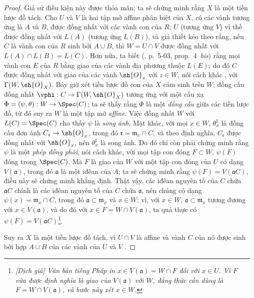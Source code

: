 \documentclass[oneside]{amsart}
\makeatletter
\newcommand{\ega@arrow}[2]{\mathchoice{#1}{#2}{#2}{#2}}
\renewcommand{\to}{\ega@arrow{\longrightarrow}{\rightarrow}}
\makeatother
\begin{document}
\begin{proof}
Giả sử điều kiện này được thỏa mãn; ta sẽ chứng minh rằng $X$ là một tiền lược đồ tách.
Cho $U$ và $V$ là hai tập mở affine phân biệt của $X$, có các vành tương ứng là $A$ và $B$, được đồng nhất với các vành con của $R$;
$U$ (tương ứng $V$) vì thế được đồng nhất  với $L(A)$ (tương ứng $L(B)$), và giả thiết kéo theo  rằng, nếu $C$ là vành con của $R$ sinh bởi $A\cup B$, thì $W=U\cap V$ được đồng nhất với $L(A)\cap L(B)=L(C)$.
Hơn nữa, ta biết (\cite{I-1}, p.~5-03, prop.~4~\emph{bis}) rằng mọi vành con $E$ của $R$ bằng giao của các vành địa phương thuộc $L(E)$;
do đó $C$ được đồng nhất với giao của các vành $\sh{O}_z$ với $z\in W$, nói cách khác , với $\Gamma(W,\sh{O}_X)$.
Bây giờ xét tiền lược đồ con của $X$ cảm sinh trên $W$;
đồng cấu đồng nhất $\vphi: C\to\Gamma(W,\sh{O}_X)$ tương ứng  với một cấu xạ $\Phi=(\psi,\theta):W\to\Spec(C)$;
ta sẽ thấy rằng $\Phi$ là một \emph{đẳng cấu} giữa các tiền lược đồ, từ đó suy ra $W$ là một tập mở \emph{affine}.
Việc đồng nhất $W$ với $L(C)=\Spec(C)$ cho thấy $\psi$ là \emph{song ánh}.
Mặt khác, với mọi $x\in W$, $\theta_x^\sharp$ là đồng cấu đơn ánh $C_{\mathfrak{r}}\to\sh{O}_x$, trong đó $\mathfrak{r}=\mathfrak{m}_x\cap C$, và theo định nghĩa, $C_{\mathfrak{r}}$ được đồng nhất với $\sh{O}_x$, nên $\theta_x^\sharp$ là song ánh.
Do đó chỉ còn phải chứng minh rằng $\psi$ là một \emph{phép đồng phôi}, nói cách khác, với mọi tập con đóng $F\subset W$, $\psi(F)$ đóng trong
$\Spec(C)$.
Mà $F$ là giao của $W$ với một tập con đóng của $U$ có dạng $V(\mathfrak{a})$, trong đó $\mathfrak{a}$ là một iđêan của $A$;
ta sẽ chứng minh rằng $\psi(F)=V(\mathfrak{a}C)$, điều này sẽ chứng minh khẳng định.
Thật vậy, các iđêan nguyên tố của $C$ chứa $\mathfrak{a}C$ chính là các iđêan nguyên tố của $C$ chứa $\mathfrak{a}$, nên chúng có dạng $\psi(x)=\mathfrak{m}_x\cap C$, trong đó $\mathfrak{a}\subset\mathfrak{m}_x$ và $x\in W$;
vì, với $x\in W$, $\mathfrak{a}\subset\mathfrak{m}_x$ tương đương với $x\in V(\mathfrak{a})$, và do đó với $x\in F=W\cap V(\mathfrak{a})$, ta quả thực có $\psi(F)=V(\mathfrak{a}C)$\footnote{\emph{[Dịch giả] Văn bản tiếng Pháp in $x\in V(\mathfrak a)=W\cap F$ đối với $x\in U$. Vì $F$ vừa được định nghĩa là giao của $V(\mathfrak a)$ với $W$, đẳng thức cần dùng là $F=W\cap V(\mathfrak a)$, và bước này xét $x\in W$.}}.

Suy ra $X$ là một tiền lược đồ tách, vì $U\cap V$ là affine và vành $C$ của nó được sinh bởi hợp $A\cup B$ của các vành của $U$ và $V$ .


\end{proof}
\end{document}
